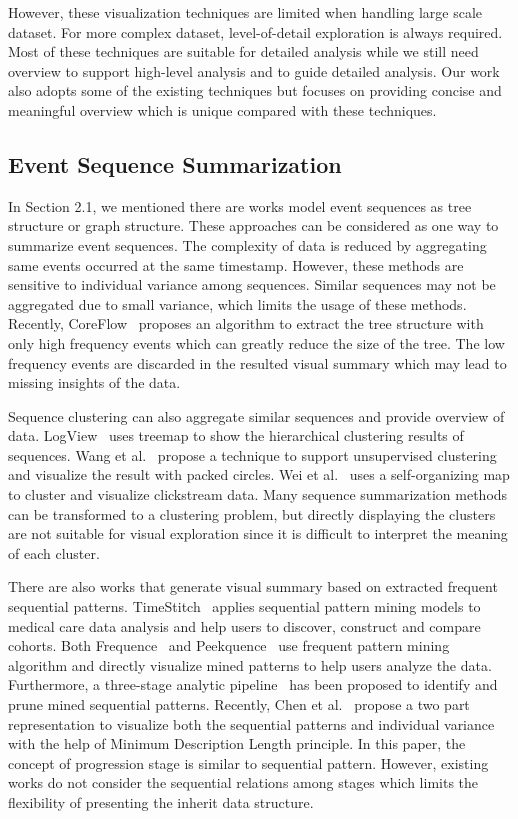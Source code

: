 However, these visualization techniques are limited when handling large scale dataset. For more complex dataset, level-of-detail exploration is always required. Most of these techniques are suitable for detailed analysis while we still need overview to support high-level analysis and to guide detailed analysis. Our work also adopts some of the existing techniques but focuses on providing concise and meaningful overview which is unique compared with these techniques.

\subsection{Event Sequence Summarization}

In Section 2.1, we mentioned there are works model event sequences as tree structure or graph structure. These approaches can be considered as one way to summarize event sequences. The complexity of data is reduced by aggregating same events occurred at the same timestamp. However, these methods are sensitive to individual variance among sequences. Similar sequences may not be aggregated due to small variance, which limits the usage of these methods. Recently, CoreFlow~\cite{liu2017coreflow} proposes an algorithm to extract the tree structure with only high frequency events which can greatly reduce the size of the tree. The low frequency events are discarded in the resulted visual summary which may lead to missing insights of the data. 

Sequence clustering can also aggregate similar sequences and provide overview of data. LogView~\cite{makanju2008logview} uses treemap to show the hierarchical clustering results of sequences. Wang et al.~\cite{wang2016unsupervised} propose a technique to support unsupervised clustering and visualize the result with packed circles. Wei et al.~\cite{wei2012visual} uses a self-organizing map to cluster and visualize clickstream data. Many sequence summarization methods can be transformed to a clustering problem, but directly displaying the clusters are not suitable for visual exploration since it is difficult to interpret the meaning of each cluster.

There are also works that generate visual summary based on extracted frequent sequential patterns. TimeStitch~\cite{polack2015timestitch} applies sequential pattern mining models to medical care data analysis and help users to discover, construct and compare cohorts. Both Frequence~\cite{perer2014frequence} and Peekquence~\cite{kwon2016peekquence} use frequent pattern mining algorithm and directly visualize mined patterns to help users analyze the data. Furthermore, a three-stage analytic pipeline~\cite{liu2017patterns} has been proposed to identify and prune mined sequential patterns. Recently, Chen et al.~\cite{chen2018sequence} propose a two part representation to visualize both the sequential patterns and individual variance with the help of Minimum Description Length principle. In this paper, the concept of progression stage is similar to sequential pattern. However, existing works do not consider the sequential relations among stages which limits the flexibility of presenting the inherit data structure. 

